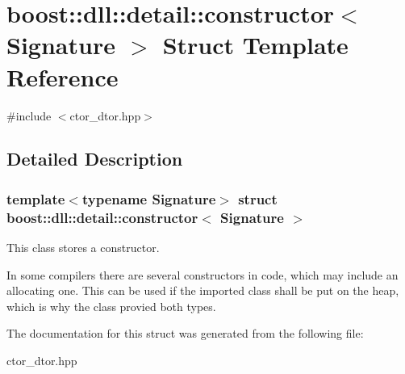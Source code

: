 \hypertarget{a01352}{}\section{boost\+:\+:dll\+:\+:detail\+:\+:constructor$<$ Signature $>$ Struct Template Reference}
\label{a01352}


{\ttfamily \#include $<$ctor\+\_\+dtor.\+hpp$>$}



\subsection{Detailed Description}
\subsubsection*{template$<$typename Signature$>$\newline
struct boost\+::dll\+::detail\+::constructor$<$ Signature $>$}

This class stores a constructor.

In some compilers there are several constructors in code, which may include an allocating one. This can be used if the imported class shall be put on the heap, which is why the class provied both types. 

The documentation for this struct was generated from the following file\+:\begin{DoxyCompactItemize}
\item 
ctor\+\_\+dtor.\+hpp\end{DoxyCompactItemize}
